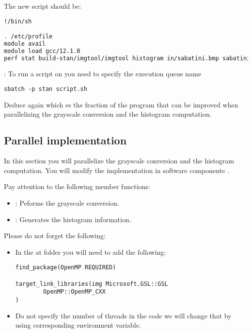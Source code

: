 The new script  should be:

\begin{lstlisting}[language=bash]
!/bin/sh

. /etc/profile
module avail
module load gcc/12.1.0
perf stat build-stan/imgtool/imgtool histogram in/sabatini.bmp sabatini-seq.hst
\end{lstlisting}

: To run a script on  you need to specify the
execution queue name

\begin{lstlisting}[style=terminal]
sbatch -p stan script.sh
\end{lstlisting}

Deduce again which es the fraction of the program that can be improved when
parallelizing the grayscale conversion and the histogram computation.

\subsection{Parallel implementation}

In this section you will parallelize the grayscale conversion and the histogram
computation. You will modify the implementation in software componente
.

Pay attention to the following member functions:

\begin{itemize}

\item {}: Peforms the grayscale
conversion.
\item {}: Generates the histogram
information.

\end{itemize}

Please do not forget the following:

\begin{itemize}

\item In the  at  folder you will need to
add the following:

\begin{lstlisting}
find_package(OpenMP REQUIRED)

target_link_libraries(img Microsoft.GSL::GSL
        OpenMP::OpenMP_CXX
)
\end{lstlisting}

\item Do not specify the number of threads in the code we will change that by
using corresponding environment variable.

\end{itemize}

